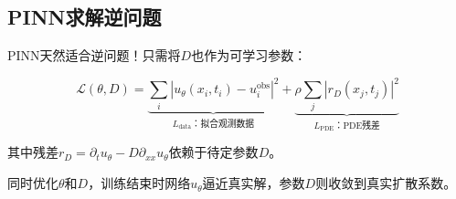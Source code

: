 \subsection{PINN求解逆问题}

PINN天然适合逆问题！只需将$D$也作为可学习参数：

\begin{equation}
    \mathcal{L}(\theta, D) = \underbrace{\sum_i |u_\theta(x_i, t_i) - u_i^{\text{obs}}|^2}_{L_{\text{data}}\text{：拟合观测数据}} + \underbrace{\rho \sum_j |r_D(x_j, t_j)|^2}_{L_{\text{PDE}}\text{：PDE残差}}
\end{equation}

其中残差$r_D = \partial_t u_\theta - D \partial_{xx} u_\theta$依赖于待定参数$D$。

同时优化$\theta$和$D$，训练结束时网络$u_\theta$逼近真实解，参数$D$则收敛到真实扩散系数。

